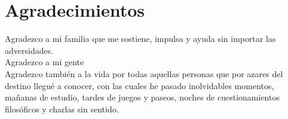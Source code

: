 \chapter{Agradecimientos}
Agradezco a mi familia que me sostiene, impulsa
y ayuda sin importar las adversidades.\\

Agradezco a mi gente\\

Agradezco también a la vida por todas aquellas personas 
que por azares del destino llegué a conocer, con las 
cuales he pasado inolvidables momentos, mañanas de estudio,
tardes de juegos y paseos, noches de cuestionamientos 
filosóficos y charlas sin sentido.\\